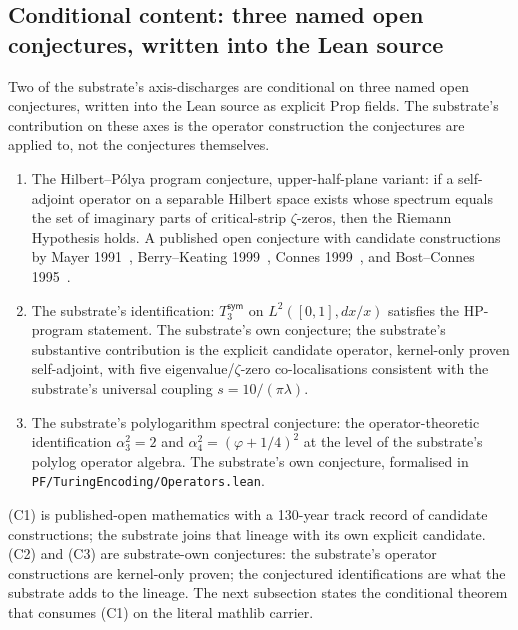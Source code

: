 \documentclass[11pt,a4paper]{amsart}
\theoremstyle{plain}
\theoremstyle{definition}
\begin{document}
\subsection{Conditional content: three named open conjectures, written into the Lean source}

Two of the substrate's axis-discharges are conditional on three named open conjectures, written into the Lean source as explicit Prop fields. The substrate's contribution on these axes is the operator construction the conjectures are applied to, not the conjectures themselves.

\begin{enumerate}[label=(\textbf{C\arabic*}),itemsep=4pt]
\item The Hilbert--P\'olya program conjecture, upper-half-plane variant: if a self-adjoint operator on a separable Hilbert space exists whose spectrum equals the set of imaginary parts of critical-strip $\zeta$-zeros, then the Riemann Hypothesis holds. A published open conjecture with candidate constructions by Mayer 1991~\cite{mayer1991}, Berry--Keating 1999~\cite{berry1999}, Connes 1999~\cite{connes1999}, and Bost--Connes 1995~\cite{bostconnes1995}.

\item The substrate's identification: $T_3^{\textsf{sym}}$ on $L^2([0,1], dx/x)$ satisfies the HP-program statement. The substrate's own conjecture; the substrate's substantive contribution is the explicit candidate operator, kernel-only proven self-adjoint, with five eigenvalue/$\zeta$-zero co-localisations consistent with the substrate's universal coupling $s = 10/(\pi\lambda)$.

\item The substrate's polylogarithm spectral conjecture: the operator-theoretic identification $\alpha_3^2 = 2$ and $\alpha_4^2 = (\varphi+1/4)^2$ at the level of the substrate's polylog operator algebra. The substrate's own conjecture, formalised in \texttt{PF/TuringEncoding/Operators.lean}.
\end{enumerate}

(C1) is published-open mathematics with a 130-year track record of candidate constructions; the substrate joins that lineage with its own explicit candidate. (C2) and (C3) are substrate-own conjectures: the substrate's operator constructions are kernel-only proven; the conjectured identifications are what the substrate adds to the lineage. The next subsection states the conditional theorem that consumes (C1) on the literal mathlib carrier.
\end{document}
